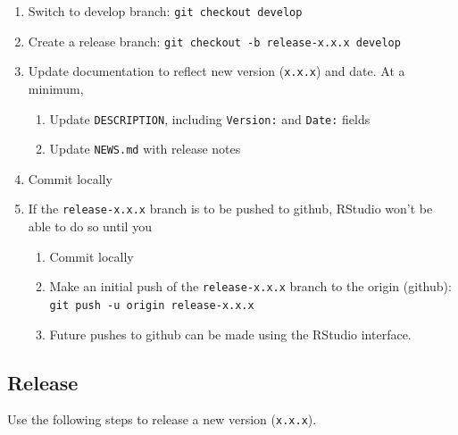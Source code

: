 \documentclass{article}
\begin{document}
\begin{enumerate}

  \item Switch to develop branch: \texttt{git checkout develop}

  \item Create a release branch: \texttt{git checkout -b release-x.x.x develop} 

  \item Update documentation to reflect new version (\texttt{x.x.x}) and date.
        At a minimum, 
  \begin{enumerate}

    \item Update \texttt{DESCRIPTION}, including \texttt{Version:} and \texttt{Date:} fields 

    \item Update \texttt{NEWS.md} with release notes

  \end{enumerate}
  \item Commit locally
  
  \item If the \texttt{release-x.x.x} branch is to be pushed to github, RStudio won't be able to do so until you
  \begin{enumerate}

    \item Commit locally

    \item Make an initial push of the \texttt{release-x.x.x} branch
	      to the origin (github): 
		  \texttt{git push -u origin release-x.x.x} 
	
	\item Future pushes to github can be made using the RStudio interface.

  \end{enumerate}

\end{enumerate}


\subsection{Release} 
\label{sec:release}

Use the following steps to release a new version (\texttt{x.x.x}).
\end{document}

